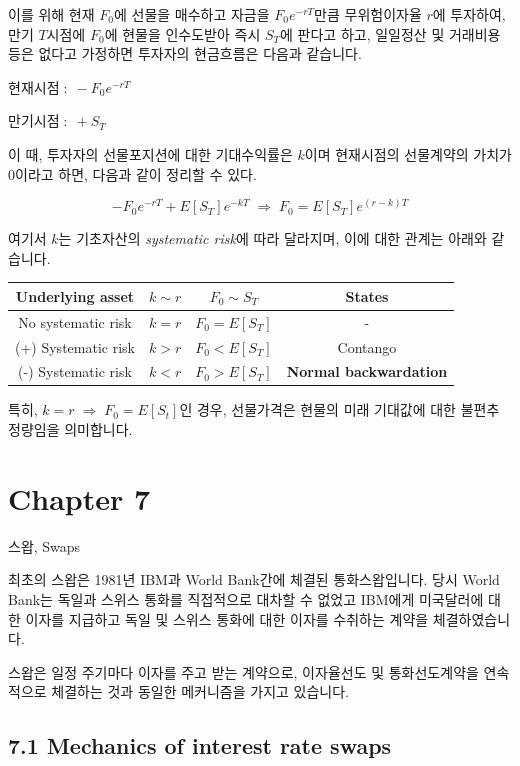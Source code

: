 \documentclass[
  letterpaper,
  DIV=11,
  numbers=noendperiod]{scrreprt}
\begin{document}
이를 위해 현재 \(F_0\)에 선물을 매수하고 자금을 \(F_0e^{-rT}\)만큼
무위험이자율 \(r\)에 투자하여, 만기 \(T\)시점에 \(F_0\)에 현물을
인수도받아 즉시 \(S_T\)에 판다고 하고, 일일정산 및 거래비용 등은 없다고
가정하면 투자자의 현금흐름은 다음과 같습니다.

\(현재시점\;:\;-F_0e^{-rT}\)

\(만기시점\;:\;+S_T\)

이 때, 투자자의 선물포지션에 대한 기대수익률은 \(k\)이며 현재시점의
선물계약의 가치가 0이라고 하면, 다음과 같이 정리할 수 있다.

\[-F_0e^{-rT}+E[S_T]e^{-kT}\;\Rightarrow\;F_0=E[S_T]e^{(r-k)T}\]

여기서 \(k\)는 기초자산의 \emph{systematic risk}에 따라 달라지며, 이에
대한 관계는 아래와 같습니다.

\begin{longtable}[]{@{}cccc@{}}
\toprule\noalign{}
Underlying asset & \(k\sim r\) & \(F_0\sim S_T\) & States \\
\midrule\noalign{}
\endhead
\bottomrule\noalign{}
\endlastfoot
No systematic risk & \(k=r\) & \(F_0=E[S_T]\) & - \\
(+) Systematic risk & \(k>r\) & \(F_0<E[S_T]\) & Contango \\
(-) Systematic risk & \(k<r\) & \(F_0>E[S_T]\) & \textbf{Normal
backwardation} \\
\end{longtable}

특히, \(k=r\;\Rightarrow\;F_0=E[S_t]\)인 경우, 선물가격은 현물의 미래
기대값에 대한 불편추정량임을 의미합니다.


\chapter*{Chapter 7}\label{chapter-7}


스왑, Swaps

최초의 스왑은 1981년 IBM과 World Bank간에 체결된 통화스왑입니다. 당시
World Bank는 독일과 스위스 통화를 직접적으로 대차할 수 없었고 IBM에게
미국달러에 대한 이자를 지급하고 독일 및 스위스 통화에 대한 이자를
수취하는 계약을 체결하였습니다.

스왑은 일정 주기마다 이자를 주고 받는 계약으로, 이자율선도 및
통화선도계약을 연속적으로 체결하는 것과 동일한 메커니즘을 가지고
있습니다.

\section*{7.1 Mechanics of interest rate
swaps}\label{mechanics-of-interest-rate-swaps}
\end{document}
